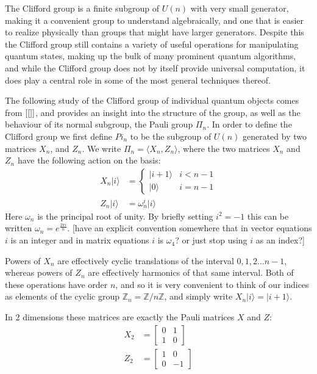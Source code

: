 \documentclass[]{article}
\newcommand{\ket}[1]{| #1 \rangle}
\begin{document}
The Clifford group is a finite subgroup of $U(n)$ with very small generator, making it a convenient group to understand algebraically, and one that is easier to realize physically than groups that might have larger generators. Despite this the Clifford group still contains a variety of useful operations for manipulating quantum states, making up the bulk of many prominent quantum algorithms, and while the Clifford group does not by itself provide universal computation, it does play a central role in some of the most general techniques thereof.

The following study of the Clifford group of individual quantum objects comes from $[\cite]$, and provides an insight into the structure of the group, as well as the behaviour of its normal subgroup, the Pauli group $\Pi_n$. In order to define the Clifford group we first define $Pi_n$ to be the subgroup of $U(n)$ generated by two matrices $X_n$, and $Z_n$. We write $\Pi_n = \langle X_n, Z_n\rangle$, where the two matrices $X_n$ and $Z_n$ have the following action on the basis:
\begin{align*}
X_n\ket{i} &= \begin{cases}\ket{i+1} & i < n-1 \\ \ket{0} & i = n-1\end{cases}
\\Z_n\ket{i} &= \omega_n^i\ket{i}
\end{align*}
Here $\omega_n$ is the principal root of unity. By briefly setting $i^2 = -1$ this can be written $\omega_n = e^{\frac{2\pi i}{n}}$. [have an explicit convention somewhere that in vector equations $i$ is an integer and in matrix equations $i$ is $\omega_4$? or just stop using $i$ as an index?]

Powers of $X_n$ are effectively cyclic translations of the interval $0, 1, 2\dots n-1$, whereas powers of $Z_n$ are effectively harmonics of that same interval. Both of these operations have order $n$, and so it is very convenient to think of our indices as elements of the cyclic group $\mathbb{Z}_n = \mathbb{Z}/n\mathbb{Z}$, and simply write $X_n\ket{i}=\ket{i+1}$.

In 2 dimensions these matrices are exactly the Pauli matrices $X$ and $Z$:
\begin{align*}
X_2 &= \left[\begin{matrix}0&1\\1&0\end{matrix}\right]
\\Z_2 &= \left[\begin{matrix}1&0\\0&-1\end{matrix}\right]
\end{align*}
\end{document}

